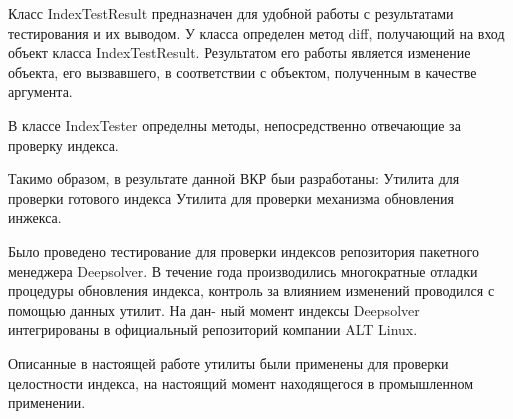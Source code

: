 \documentclass[a4paper]{article}
\begin{document}
Класс IndexTestResult предназначен для удобной работы с результатами тестирования 
и их выводом. У класса определен метод diff, получающий на вход объект класса IndexTestResult. 
Результатом его работы является изменение объекта, его вызвавшего, в соответствии
с объектом, полученным в качестве аргумента.

В классе IndexTester определны методы, непосредственно отвечающие за проверку индекса.

Такимо образом, в результате данной ВКР быи разработаны:
Утилита для проверки готового индекса
Утилита для проверки механизма обновления инжекса.

Было проведено тестирование для проверки индексов репозитория пакетного менеджера
Deepsolver.
В течение года производились многократные отладки процедуры обновления
индекса, контроль за влиянием изменений проводился с помощью данных утилит. На дан-
ный момент индексы Deepsolver интегрированы в официальный репозиторий компании ALT Linux.

Описанные в настоящей работе утилиты были применены для проверки целостности индекса, 
на настоящий момент находящегося в промышленном применении.
\end{document}
